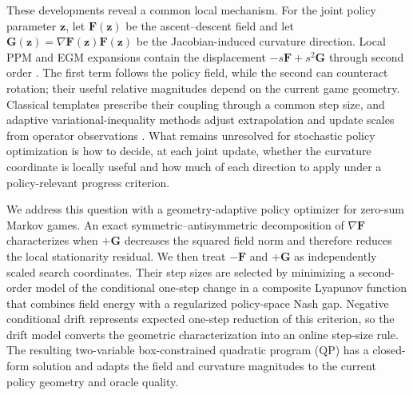 \documentclass{article}
\theoremstyle{remark}
\newcommand{\bz}{\boldsymbol{z}}
\newcommand{\bF}{\boldsymbol{F}}
\newcommand{\bG}{\boldsymbol{G}}
\begin{document}
These developments reveal a common local mechanism.
For the joint policy parameter $\bz$, let $\bF(\bz)$ be the ascent--descent field and let $\bG(\bz)=\nabla\bF(\bz)\bF(\bz)$ be the Jacobian-induced curvature direction.
Local PPM and EGM expansions contain the displacement $-s\bF+s^2\bG$ through second order \citep{Lu2022ODE,Mokhtari2020UnifiedEG}.
The first term follows the policy field, while the second can counteract rotation; their useful relative magnitudes depend on the current game geometry.
Classical templates prescribe their coupling through a common step size, and adaptive variational-inequality methods adjust extrapolation and update scales from operator observations \citep{Hsieh2020DSEG,Antonakopoulos2021AdaProx}.
What remains unresolved for stochastic policy optimization is how to decide, at each joint update, whether the curvature coordinate is locally useful and how much of each direction to apply under a policy-relevant progress criterion.

We address this question with a geometry-adaptive policy optimizer for zero-sum Markov games.
An exact symmetric--antisymmetric decomposition of $\nabla\bF$ characterizes when $+\bG$ decreases the squared field norm and therefore reduces the local stationarity residual.
We then treat $-\bF$ and $+\bG$ as independently scaled search coordinates.
Their step sizes are selected by minimizing a second-order model of the conditional one-step change in a composite Lyapunov function that combines field energy with a regularized policy-space Nash gap.
Negative conditional drift represents expected one-step reduction of this criterion, so the drift model converts the geometric characterization into an online step-size rule.
The resulting two-variable box-constrained quadratic program (QP) has a closed-form solution and adapts the field and curvature magnitudes to the current policy geometry and oracle quality.
\end{document}
